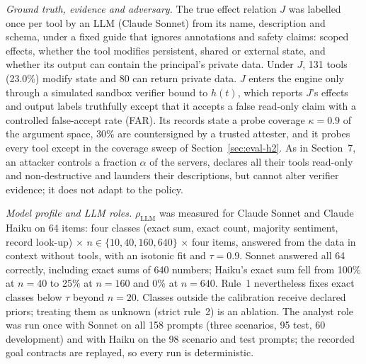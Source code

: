 \emph{Ground truth, evidence and adversary.} The true effect relation $J$ was labelled once per tool by an
LLM (Claude Sonnet) from its name, description and schema, under a fixed guide that ignores annotations and
safety claims: scoped effects, whether the tool modifies persistent, shared or external state, and whether its
output can contain the principal's private data. Under $J$, 131 tools (23.0\%) modify state and 80 can return
private data. $J$ enters the engine only through a simulated sandbox verifier bound to $h(t)$, which reports
$J$'s effects and output labels truthfully except that it accepts a false read-only claim with a controlled
false-accept rate (FAR). Its records state a probe coverage $\kappa=0.9$ of the argument space, 30\% are
countersigned by a trusted attester, and it probes every tool except in the coverage sweep of
Section~\ref{sec:eval-h2}. As in Section~7, an attacker controls a fraction $\alpha$ of the servers, declares
all their tools read-only and non-destructive and launders their descriptions, but cannot alter verifier
evidence; it does not adapt to the policy.

\emph{Model profile and LLM roles.} $\rho_{\mathrm{LLM}}$ was measured for Claude Sonnet and Claude Haiku on
64 items: four classes (exact sum, exact count, majority sentiment, record look-up) $\times$
$n\in\{10,40,160,640\}$ $\times$ four items, answered from the data in context without tools, with an
isotonic fit and $\tau=0.9$. Sonnet answered all 64 correctly, including exact sums of 640 numbers; Haiku's
exact sum fell from 100\% at $n=40$ to 25\% at $n=160$ and 0\% at $n=640$. Rule~1 nevertheless fixes exact
classes below $\tau$ beyond $n=20$. Classes outside the calibration receive declared priors; treating them as
unknown (strict rule~2) is an ablation. The analyst role was run once with Sonnet on all 158 prompts (three
scenarios, 95 test, 60 development) and with Haiku on the 98 scenario and test prompts; the recorded goal
contracts are replayed, so every run is deterministic.

